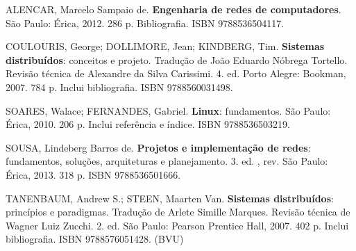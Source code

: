 \begin{pud}
\begin{bibcomplementar}
		\item ALENCAR, Marcelo Sampaio de. \textbf{Engenharia de redes de computadores}. São Paulo: Érica, 2012. 286 p. Bibliografia. ISBN 9788536504117.
		\item COULOURIS, George; DOLLIMORE, Jean; KINDBERG, Tim. \textbf{Sistemas distribuídos}: conceitos e projeto. Tradução de João Eduardo Nóbrega Tortello. Revisão técnica de Alexandre da Silva Carissimi. 4. ed. Porto Alegre: Bookman, 2007. 784 p. Inclui bibliografia. ISBN 9788560031498.
		\item SOARES, Walace; FERNANDES, Gabriel. \textbf{Linux}: fundamentos. São Paulo: Érica, 2010. 206 p. Inclui referência e índice. ISBN 9788536503219.
		\item SOUSA, Lindeberg Barros de. \textbf{Projetos e implementação de redes}: fundamentos, soluções, arquiteturas e planejamento. 3. ed. , rev. São Paulo: Érica, 2013. 318 p. ISBN 9788536501666.		
		\item TANENBAUM, Andrew S.; STEEN, Maarten Van. \textbf{Sistemas distribuídos}: princípios e paradigmas. Tradução de Arlete Simille Marques. Revisão técnica de Wagner Luiz Zucchi. 2. ed. São Paulo: Pearson Prentice Hall, 2007. 402 p. Inclui bibliografia. ISBN 9788576051428. (BVU)

	\end{bibcomplementar}
	

\end{pud}


